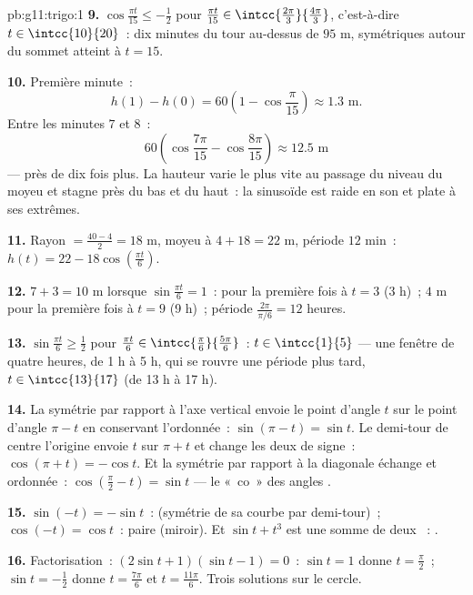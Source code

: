 \begin{solution}{pb:g11:trigo:1}
\textbf{9.} $\cos\frac{\pi t}{15} \leq -\frac12$ pour
$\frac{\pi t}{15} \in \intcc{\frac{2\pi}{3}}{\frac{4\pi}{3}}$,
c'est-à-dire $t \in \intcc{10}{20}$~: dix minutes du tour au-dessus
de $95$ m, symétriques autour du sommet atteint à $t = 15$.

\textbf{10.} Première minute~:
\[
h(1) - h(0) = 60\left(1 - \cos\frac{\pi}{15}\right)
\approx 1.3 \text{ m}.
\]
Entre les minutes $7$ et $8$~:
\[
60\left(\cos\frac{7\pi}{15} - \cos\frac{8\pi}{15}\right)
\approx 12.5 \text{ m}
\]
--- près de dix fois plus. La hauteur varie le plus vite au passage
du niveau du moyeu et stagne près du bas et du haut~: la sinusoïde
est raide en son  et plate à ses extrêmes.

\textbf{11.} Rayon $= \frac{40 - 4}{2} = 18$ m, moyeu à
$4 + 18 = 22$ m, période $12$ min~:
$h(t) = 22 - 18\cos\left(\frac{\pi t}{6}\right)$.

\textbf{12.}  $7 + 3 = 10$ m lorsque
$\sin\frac{\pi t}{6} = 1$~: pour la première fois à $t = 3$
(3 h)~;  $4$ m pour la première fois à $t = 9$ (9 h)~;
période $\frac{2\pi}{\pi/6} = 12$ heures.

\textbf{13.} $\sin\frac{\pi t}{6} \geq \frac12$ pour
$\frac{\pi t}{6} \in \intcc{\frac\pi6}{\frac{5\pi}{6}}$~:
$t \in \intcc{1}{5}$ --- une fenêtre de quatre heures, de 1 h à
5 h, qui se rouvre une période plus tard, $t \in \intcc{13}{17}$
(de 13 h à 17 h).

\textbf{14.} La symétrie par rapport à l'axe vertical envoie le
point d'angle $t$ sur le point d'angle $\pi - t$ en conservant
l'ordonnée~: $\sin(\pi - t) = \sin t$. Le demi-tour de centre
l'origine envoie $t$ sur $\pi + t$ et change les deux  de
signe~: $\cos(\pi + t) = -\cos t$. Et la symétrie par rapport à la
diagonale échange  et ordonnée~:
$\cos\left(\frac\pi2 - t\right) = \sin t$ --- le «~co~» des angles
.

\textbf{15.} $\sin(-t) = -\sin t$~:  (symétrie de sa courbe
par demi-tour)~; $\cos(-t) = \cos t$~: paire (miroir). Et
$\sin t + t^3$ est une somme de deux ~: .

\textbf{16.} Factorisation~: $(2\sin t + 1)(\sin t - 1) = 0$~:
$\sin t = 1$ donne $t = \frac\pi2$~; $\sin t = -\frac12$ donne
$t = \frac{7\pi}{6}$ et $t = \frac{11\pi}{6}$. Trois solutions sur
le cercle.


\end{solution}
